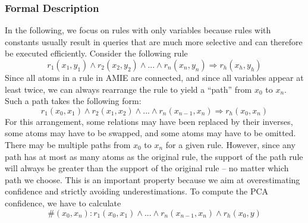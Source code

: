 {%
%




\subsubsection{Formal Description}

In the following, we focus on rules with only variables because rules with constants usually result in queries that are much more selective and can therefore be executed efficiently.
Consider the following rule
$$
  r_1(x_1,y_1) \wedge r_2(x_2,y_2) \wedge ... \wedge r_n(x_n,y_n) \Rightarrow r_h(x_h,y_h)
$$
Since all atoms in a rule in AMIE are connected, and since all variables appear at least twice, we can always rearrange the rule to yield a ``path'' from $x_0$ to $x_n$. Such a path takes the following form:
$$
  r_1(x_0,x_1) \wedge r_2(x_1,x_2) \wedge ... \wedge r_n(x_{n-1},x_n) \Rightarrow r_h(x_0,x_n)
$$
For this arrangement, some relations may have been replaced by their inverses, some atoms may have to be swapped, and some atoms may have to be omitted.
There may be multiple paths from $x_0$ to $x_n$ for a given rule.
However, since any path has at most as many atoms as the original rule, the support of the path rule will always be greater than the support of the original rule -- no matter which path we choose.
This is an important property because we aim at overestimating confidence and strictly avoiding underestimations.
To compute the PCA confidence, we have to calculate
$$
 \#(x_0,x_n): r_1(x_0,x_1) \wedge ... \wedge r_n(x_{n-1},x_n) \wedge r_h(x_0,y)
$$
}

